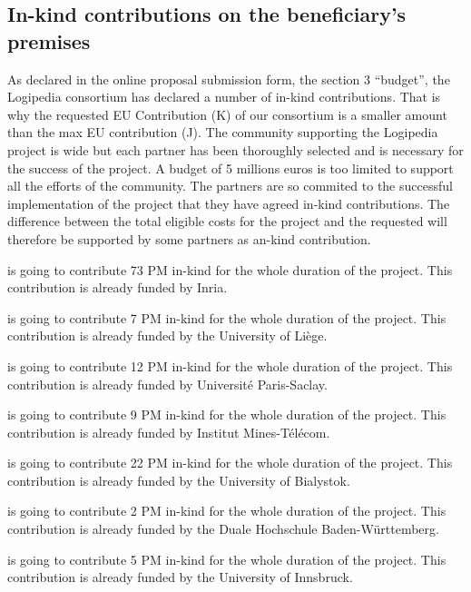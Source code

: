 \subsection*{In-kind contributions on the beneficiary’s premises}

As declared in the online proposal submission form, the section 3
``budget'', the Logipedia consortium has declared a number of in-kind
contributions. That is why the requested EU Contribution (K) of our
consortium is a smaller amount than the max EU contribution (J). The
community supporting the Logipedia project is wide but each partner
has been thoroughly selected and is necessary for the success of the
project.
A budget of 5 millions euros is too limited to support all
the efforts of the community.
The partners are so commited to the successful implementation of the
project that they have agreed in-kind contributions.
The difference between the total
eligible costs for the project and the requested will therefore be
supported by some partners as an-kind contribution.

 is going to contribute
73 PM in-kind for the whole duration of the project.
This contribution is already funded by Inria.

 is going to contribute 7 PM in-kind for the whole duration of the project.
This contribution is already funded by the University of Liège.

 is going to contribute 12 PM in-kind for the whole duration of the project.
This contribution is already funded by Université Paris-Saclay.

 is going to contribute 9 PM in-kind for the whole duration of the project.
This contribution is already funded by Institut Mines-Télécom.

 is going to contribute 22 PM in-kind for the whole duration of the project.
This contribution is already funded by the University of Bialystok.

 is going to contribute 2 PM in-kind for the whole duration of the project.
This contribution is already funded by the Duale Hochschule Baden-Württemberg.

 is going to contribute 5 PM in-kind for the whole duration of the project.
This contribution is already funded by the University of Innsbruck.

